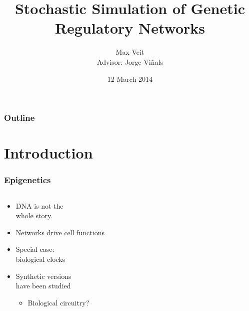 \documentclass[xcolor={usenames,dvipsnames,svgnames}]{beamer}
\begin{document}
\title[Genetic Networks]{Stochastic Simulation of Genetic Regulatory Networks}
\author[Max Veit]{Max Veit\\Advisor: Jorge Viñals}
\date[2014-03-12]{12 March 2014}
\subject{Physics}

\frame{\titlepage}

\begin{frame} \frametitle{Outline}
	\tableofcontents
\end{frame}

\section{Introduction} %
\label{sec:introduction}
\begin{frame}
    \frametitle{Epigenetics}
    \begin{columns}[t]
        \begin{column}{0.5\textwidth}
            \begin{itemize}
                \item DNA is not the\\
                    whole story.
                \item Networks drive cell functions
                \item Special case:\\
                    biological clocks
                \item Synthetic versions\\
                    have been studied
                \begin{itemize}
                    \item Biological circuitry?
                \end{itemize}
            \end{itemize}
        \end{column}
        \begin{column}[T]{0.5\textwidth}

\end{column}
\end{columns}
\end{frame}
\end{document}
